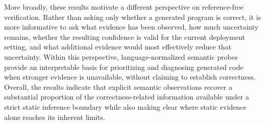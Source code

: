 \documentclass[conference]{IEEEtran}
\begin{document}
More broadly, these results motivate a different perspective on reference-free verification. Rather than asking only whether a generated program is correct, it is more informative to ask what evidence has been observed, how much uncertainty remains, whether the resulting confidence is valid for the current deployment setting, and what additional evidence would most effectively reduce that uncertainty. Within this perspective, language-normalized semantic probes provide an interpretable basis for prioritizing and diagnosing generated code when stronger evidence is unavailable, without claiming to establish correctness. Overall, the results indicate that explicit semantic observations recover a substantial proportion of the correctness-related information available under a strict static inference boundary while also making clear where static evidence alone reaches its inherent limits.

\begingroup
\let\oldthebibliography\thebibliography
\let\endoldthebibliography\endthebibliography
\renewenvironment{thebibliography}[1]{\oldthebibliography{#1}\normalsize}{\endoldthebibliography}
\setlength{\itemsep}{0pt}
\def\IEEEbibitemsep{0pt plus 0.2pt}


\endgroup
\end{document}
